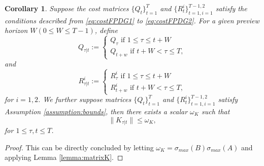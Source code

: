 \documentclass{article}
\newcommand{\transpose}{\mathsf{T}}
\newtheorem{corollary}{Corollary}
\begin{document}

\begin{corollary}\label{corrolary:boundedK}
    Suppose the cost matrices $\{Q_{t}\}_{t=1}^{T}$ and $\{R_{t}^{i}\}_{t=1,i=1}^{T-1,2}$ satisfy the conditions described from \eqref{eq:costFPDG1} to \eqref{eq:costFPDG2}.
    For a given preview horizon $W(0\leq W \leq T-1)$, define
    \begin{equation}
        Q_{\tau|t}:= 
        \begin{cases}
            Q_{\tau} \text{ if $1\leq \tau \leq t+W$}\\
            Q_{t+w} \text{ if $t+W < \tau \leq T$},
        \end{cases}
    \end{equation}
    and
    \begin{equation}
        R_{\tau|t}^{i}:= 
        \begin{cases}
            R_{\tau}^{i} \text{ if $1\leq \tau \leq t+W$}\\
            R_{t+w}^{i} \text{ if $t+W < \tau \leq T$},
        \end{cases}
    \end{equation}
    for $i = {1,2}$.
    We further suppose matrices $\{Q_{t}\}_{t=1}^{T}$ and $\{R_{t}^{i}\}_{t=1,i=1}^{T-1,2}$ satisfy Assumption \ref{assumption:bounds}, then there exists a scalar $\omega_{K}$ such that
    \begin{equation*}
        \|K_{\tau|t}\| \leq \omega_{K},
    \end{equation*}
    for $1\leq \tau,t\leq T$.
\end{corollary}

\begin{proof}
    This can be directly concluded by letting $\omega_{K} = \sigma_{max}(B)\sigma_{max}(A)$ and applying Lemma \ref{lemma:matrixK}.
\end{proof}
\end{document}
